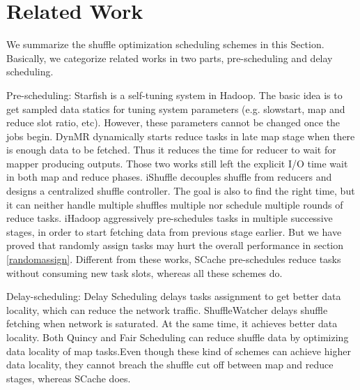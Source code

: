 \section{Related Work}
We summarize the shuffle optimization scheduling schemes in this Section. Basically, we categorize related works in two parts, pre-scheduling and delay scheduling.

Pre-scheduling: Starfish\cite{starfish} is a self-tuning system in Hadoop. The basic idea is to get sampled data statics for tuning system parameters (e.g. slowstart, map and reduce slot ratio, etc). However, these parameters cannot be changed once the jobs begin. DynMR\cite{dynmr} dynamically starts reduce tasks in late map stage when there is enough data to be fetched. Thus it reduces the time for reducer to wait for mapper producing outputs. Those two works still left the explicit I/O time wait in both map and reduce phases. iShuffle\cite{ishuffle} decouples shuffle from reducers and designs a centralized shuffle controller. The goal is also to find the right time, but it can neither handle multiple shuffles multiple nor schedule multiple rounds of reduce tasks. iHadoop\cite{ihadoop} aggressively pre-schedules tasks in multiple successive stages, in order to start fetching data from previous stage earlier. But we have proved that randomly assign tasks may hurt the overall performance in section \ref{randomassign}. Different from these works, SCache pre-schedules reduce tasks without consuming new task slots, whereas all these schemes do.

Delay-scheduling: Delay Scheduling\cite{delay} delays tasks assignment to get better data locality, which can reduce the network traffic. ShuffleWatcher\cite{shufflewatcher} delays shuffle fetching when network is saturated. At the same time, it achieves better data locality. Both Quincy\cite{quincy} and Fair Scheduling\cite{preemptive} can reduce shuffle data by optimizing data locality of map tasks.Even though these kind of schemes can achieve higher data locality, they cannot breach the shuffle cut off between map and reduce stages, whereas SCache does. 